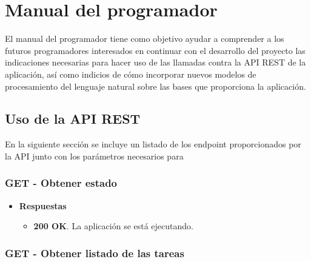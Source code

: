 \section{Manual del programador}

El manual del programador tiene como objetivo ayudar a comprender a los futuros programadores interesados en continuar con el desarrollo del proyecto las indicaciones necesarias para hacer uso de las llamadas contra la API REST de la aplicación, así como indicios de cómo incorporar nuevos modelos de procesamiento del lenguaje natural sobre las bases que proporciona la aplicación.

\subsection{Uso de la API REST}

En la siguiente sección se incluye un listado de los endpoint proporcionados por la API junto con los parámetros necesarios para

\subsubsection{GET - Obtener estado}

\begin{itemize} \setlength\itemsep{0.2em}
    \item[] \textbf{Respuestas}
    \begin{itemize} \setlength\itemsep{0.2em}
        \item[] \textbf{200 OK}. La aplicación se está ejecutando.
    \end{itemize}
\end{itemize}

\subsubsection{GET - Obtener listado de las tareas}

